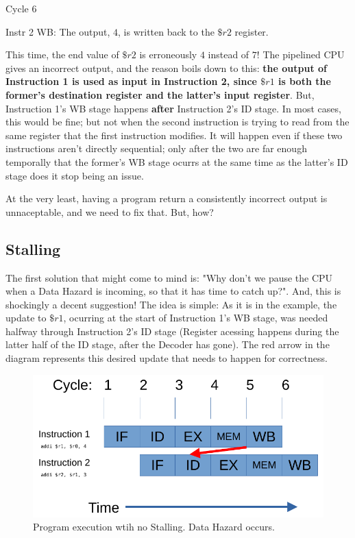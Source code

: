 \documentclass[12pt,twoside]{reedthesis}
\begin{document}
Cycle 6

\qquad Instr 2 WB: The output, $4$, is written back to the $\$r2$ register.

\vspace{5mm}

This time, the end value of $\$r2$ is erroneously $4$ instead of $7$! The pipelined CPU gives an incorrect output, and the reason boils down to this: \textbf{the output of Instruction 1 is used as input in Instruction 2, since $\$r1$ is both the former's destination register and the latter's input register}. But, Instruction 1's WB stage happens \textbf{after} Instruction 2's ID stage. In most cases, this would be fine; but not when the second instruction is trying to read from the same register that the first instruction modifies. It will happen even if these two instructions aren't directly sequential; only after the two are far enough temporally that the former's WB stage ocurrs at the same time as the latter's ID stage does it stop being an issue.

At the very least, having a program return a consistently incorrect output is unnaceptable, and we need to fix that. But, how?

\subsection{Stalling}

The first solution that might come to mind is: "Why don't we pause the CPU when a Data Hazard is incoming, so that it has time to catch up?". And, this is shockingly a decent suggestion! The idea is simple: As it is in the example, the update to $\$r1$, ocurring at the start of Instruction 1's WB stage, was needed halfway through Instruction 2's ID stage (Register acessing happens during the latter half of the ID stage, after the Decoder has gone). The red arrow in the diagram represents this desired update that needs to happen for correctness.

\begin{figure}[h!]

	\centering
	\includegraphics[scale=0.9]{nostall}
	\caption{Program execution wtih no Stalling. Data Hazard occurs.}
	\label{no-stall}
\end{figure}
\end{document}
